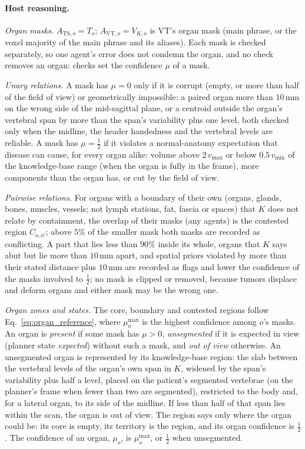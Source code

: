 \documentclass[fleqn,10pt]{olplainarticle}
\begin{document}
\paragraph{Host reasoning.}
\label{sec:host_details}
\emph{Organ masks.} $A_{\mathrm{TS},o}=T_o$; $A_{\mathrm{VT},o}=V_{K,o}$ is VT's organ mask (main phrase, or the voxel
majority of the main phrase and its aliases). Each mask is checked separately, so one agent's error does not condemn the
organ, and no check removes an organ: checks set the confidence $\mu$ of a mask.

\emph{Unary relations.} A mask has $\mu=0$ only if it is corrupt (empty, or more than half of the field of view) or
geometrically impossible: a paired organ more than $10$\,mm on the wrong side of the mid-sagittal plane, or a centroid
outside the organ's vertebral span by more than the span's variability plus one level, both checked only when the
midline, the header handedness and the vertebral levels are reliable. A mask has $\mu=\tfrac12$ if it violates a
normal-anatomy expectation that disease can cause, for every organ alike: volume above $2\,v_{\max}$ or below
$0.5\,v_{\min}$ of the knowledge-base range (when the organ is fully in the frame), more components than the organ has, or
cut by the field of view.

\emph{Pairwise relations.} For organs with a boundary of their own (organs, glands, bones, muscles, vessels; not lymph
stations, fat, fascia or spaces) that $K$ does not relate by containment, the overlap of their masks (any agents) is the
contested region $C_{o,o'}$; above $5\%$ of the smaller mask both masks are recorded as conflicting. A part that lies less
than $90\%$ inside its whole, organs that $K$ says abut but lie more than $10$\,mm apart, and spatial priors violated by more
than their stated distance plus $10$\,mm are recorded as flags and lower the confidence of the masks involved to
$\tfrac12$; no mask is clipped or removed, because tumors displace and deform organs and either mask may be the wrong one.

\emph{Organ zones and states.} The core, boundary and contested regions follow Eq.~\eqref{eq:organ_reference}, where
$\mu^{\max}_o$ is the highest confidence among $o$'s masks. An organ is \emph{present} if some mask has $\mu>0$,
\emph{unsegmented} if it is expected in view (planner state \emph{expected}) without such a mask, and \emph{out of view}
otherwise. An unsegmented organ is represented by its knowledge-base region: the slab between the vertebral levels of the
organ's own span in $K$, widened by the span's variability plus half a level, placed on the patient's segmented vertebrae
(on the planner's frame when fewer than two are segmented), restricted to the body and, for a lateral organ, to its side
of the midline. If less than half of that span lies within the scan, the organ is out of view. The region says only where
the organ could be: its core is empty, its territory is the region, and its organ confidence is $\tfrac12$. The confidence of an organ, $\mu_o$, is $\mu^{\max}_o$, or
$\tfrac12$ when unsegmented.
\end{document}
